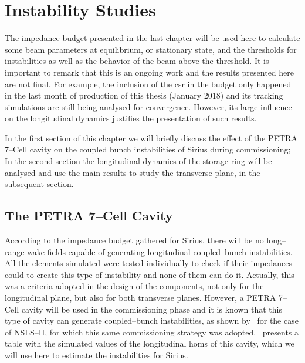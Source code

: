 \chapter{Instability Studies}\label{cap:instabilities_studies}

    The impedance budget presented in the last chapter will be used here to calculate some beam parameters at equilibrium, or stationary state, and the thresholds for instabilities as well as the behavior of the beam above the threshold. It is important to remark that this is an ongoing work and the results presented here are not final. For example, the inclusion of the \gls{csr} in the budget only happened in the last month of production of this thesis (January 2018) and its tracking simulations are still being analysed for convergence. However, its large influence on the longitudinal dynamics justifies the presentation of such results.

    In the first section of this chapter we will briefly discuss the effect of the PETRA 7--Cell cavity on the coupled bunch instabilities of Sirius during commissioning; In the second section the longitudinal dynamics of the storage ring will be analysed and use the main results to study the transverse plane, in the subsequent section.

\section{The PETRA 7--Cell Cavity}

    According to the impedance budget gathered for Sirius, there will be no long--range wake fields capable of generating longitudinal coupled--bunch instabilities. All the elements simulated were tested individually to check if their impedances could to create this type of instability and none of them can do it. Actually, this was a criteria adopted in the design of the components, not only for the longitudinal plane, but also for both transverse planes. However, a PETRA 7--Cell cavity will be used in the commissioning phase and it is known that this type of cavity can generate coupled--bunch instabilities, as shown by~ for the case of NSLS--II, for which this same commissioning strategy was adopted.~ presents a table with the simulated values of the longitudinal \glspl{hom} of this cavity, which we will use here to estimate the instabilities for Sirius.

